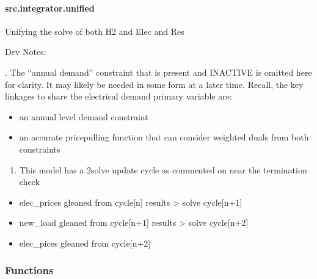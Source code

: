 \documentclass[letterpaper,10pt,english]{sphinxmanual}
\begin{document}
\sphinxstepscope


\paragraph{src.integrator.unified}
\label{\detokenize{src.integrator.unified:module-src.integrator.unified}}\label{\detokenize{src.integrator.unified:src-integrator-unified}}\label{\detokenize{src.integrator.unified::doc}}
\sphinxAtStartPar
Unifying the solve of both H2 and Elec and Res

\sphinxAtStartPar
Dev Notes:

. The “annual demand” constraint that is present and INACTIVE is omitted here for clarity.
It may likely be needed \sphinxhyphen{} in some form \sphinxhyphen{} at a later time. Recall, the key linkages to share the
electrical demand primary variable are:
\begin{itemize}
\item {} 
\sphinxAtStartPar
an annual level demand constraint

\item {} 
\sphinxAtStartPar
an accurate price\sphinxhyphen{}pulling function that can consider weighted duals from both constraints

\end{itemize}
\begin{enumerate}
%
\setcounter{enumi}{1}
\item {} 
\sphinxAtStartPar
This model has a 2\sphinxhyphen{}solve update cycle as commented on near the termination check

\end{enumerate}
\begin{itemize}
\item {} 
\sphinxAtStartPar
elec\_prices gleaned from cycle{[}n{]} results \sphinxhyphen{}\textgreater{} solve cycle{[}n+1{]}

\item {} 
\sphinxAtStartPar
new\_load gleaned from cycle{[}n+1{]} results \sphinxhyphen{}\textgreater{} solve cycle{[}n+2{]}

\item {} 
\sphinxAtStartPar
elec\_pices gleaned from cycle{[}n+2{]}

\end{itemize}
\subsubsection*{Functions}
\end{document}
